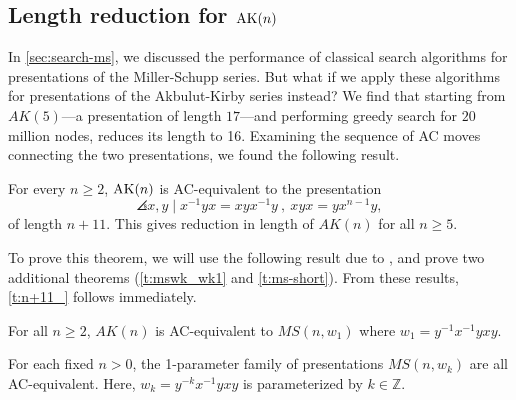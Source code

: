 

\subsection{Length reduction for $\text{AK}(n)$}
\label{sec:len-reduction}

In \cref{sec:search-ms}, we discussed the performance of classical search algorithms for presentations of the Miller-Schupp series. But what if we apply these algorithms for presentations of the Akbulut-Kirby series instead? We find that starting from $AK(5)$---a presentation of length $17$---and performing greedy search for $20$ million nodes, reduces its length to 16. Examining the sequence of AC moves connecting the two presentations, we found the following result.

\begin{theorem}\label{t:n+11_}
	For every $n\geq 2$, $\text{AK}(n)$ is AC-equivalent to the presentation
	\[
	\angles{ x,y \mid x^{-1} y x = x y x^{-1} y \ ,\  xyx=yx^{n-1}y },
	\]
	of length $n+11$. This gives reduction in length of $AK(n)$ for all $n \geq 5$.
\end{theorem}

To prove this theorem, we will  use the following result due to \cite{MMS}, and prove two additional theorems (\cref{t:mswk_wk1} and \cref{t:ms-short}). From these results, \cref{t:n+11_} follows immediately. 

\begin{proposition}
    \label{t:MS-AK-MS}
    For all $n \geq 2$, $AK(n)$ is AC-equivalent to $MS(n, w_1)$ where $w_1 = y^{-1} x^{-1} y x y$.
\end{proposition}

\begin{theorem}\label{t:mswk_wk1}
    For each fixed $n > 0$, the 1-parameter family of presentations $MS(n, w_k)$ are all AC-equivalent. Here, $w_k = y^{-k} x^{-1} y x y$ is parameterized by $k \in \mathbb{Z}$. 
\end{theorem}


